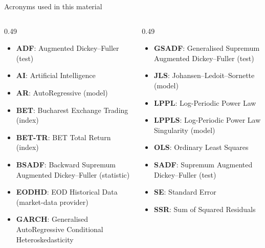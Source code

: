 {
\begin{frame}[noframenumbering]
    \titlepage
\end{frame}
}
\begin{frame}{Acronyms used in this material}
\begin{columns}[T]
\begin{column}{0.49\textwidth}
\begin{itemize}\setlength{\itemsep}{0pt}
    \item \textbf{ADF}: Augmented Dickey–Fuller (test)
    \item \textbf{AI}: Artificial Intelligence
    \item \textbf{AR}: AutoRegressive (model)
    \item \textbf{BET}: Bucharest Exchange Trading (index)
    \item \textbf{BET-TR}: BET Total Return (index)
    \item \textbf{BSADF}: Backward Supremum Augmented Dickey–Fuller (statistic)
    \item \textbf{EODHD}: EOD Historical Data (market-data provider)
    \item \textbf{GARCH}: Generalised AutoRegressive Conditional Heteroskedasticity
\end{itemize}
\end{column}
\begin{column}{0.49\textwidth}
\begin{itemize}\setlength{\itemsep}{0pt}
    \item \textbf{GSADF}: Generalised Supremum Augmented Dickey–Fuller (test)
    \item \textbf{JLS}: Johansen–Ledoit–Sornette (model)
    \item \textbf{LPPL}: Log-Periodic Power Law
    \item \textbf{LPPLS}: Log-Periodic Power Law Singularity (model)
    \item \textbf{OLS}: Ordinary Least Squares
    \item \textbf{SADF}: Supremum Augmented Dickey–Fuller (test)
    \item \textbf{SE}: Standard Error
    \item \textbf{SSR}: Sum of Squared Residuals
\end{itemize}
\end{column}
\end{columns}
\end{frame}

